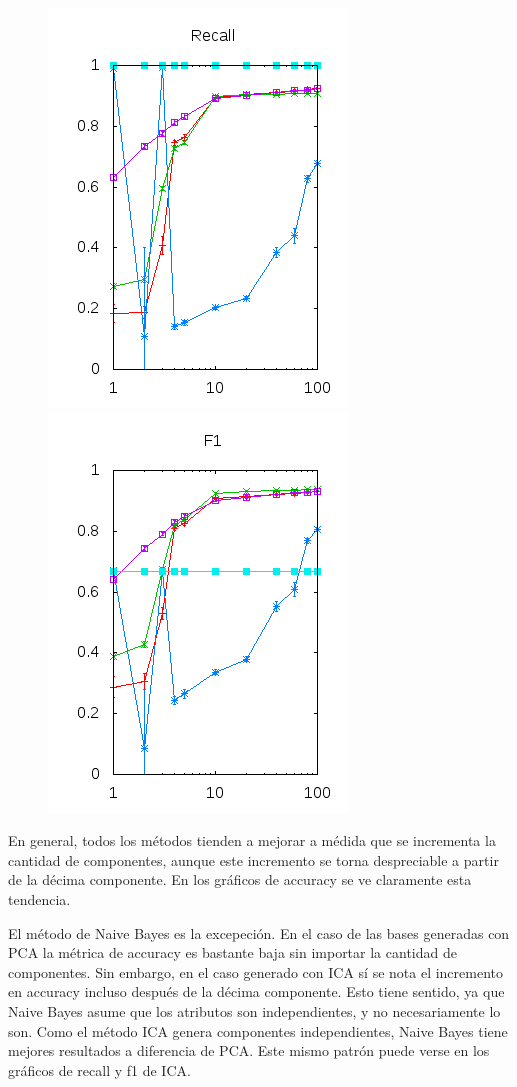 \documentclass[10pt, a4paper]{article}
\begin{document}
\begin{figure}[H]
\begin{minipage}{1\textwidth}
	\includegraphics[scale=0.5]{../src/data/reica.png}
	\includegraphics[scale=0.5]{../src/data/f1ica.png}
  \end{minipage}
\end{figure}

En general, todos los métodos tienden a mejorar a médida que se incrementa la cantidad de componentes, aunque este incremento se torna despreciable a partir de la décima componente. En los gráficos de accuracy se ve claramente esta tendencia.

El método de Naive Bayes es la excepeción.
En el caso de las bases generadas con PCA la métrica de accuracy es bastante baja sin importar la cantidad de componentes.
Sin embargo, en el caso generado con ICA sí se nota el incremento en accuracy incluso después de la décima componente. Esto tiene sentido, ya que Naive Bayes asume que los atributos son independientes, y no necesariamente lo son. Como el método ICA genera componentes independientes, Naive Bayes tiene mejores resultados a diferencia de PCA. Este mismo patrón puede verse en los gráficos de recall y f1 de ICA.
\end{document}
